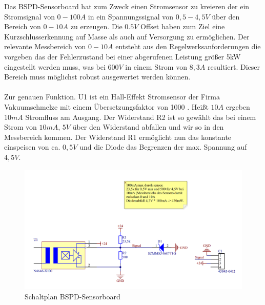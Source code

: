 Das  \ac{BSPD}-Sensorboard hat zum Zweck einen Stromsensor zu kreieren der ein Stromsignal von \ensuremath{0-100 A} in ein Spannungssignal von \ensuremath{0,5-4,5 V} über den Bereich von \ensuremath{0-10 A} zu erzeugen. Die \ensuremath{0.5 V} Offset haben zum Ziel eine Kurzschlusserkennung auf Masse als auch auf Versorgung zu ermöglichen. Der relevante Messbereich von \ensuremath{0-10 A} entsteht aus den Regelwerksanforderungen die vorgeben das der Fehlerzustand bei einer abgerufenen Leistung größer 5kW eingestellt werden muss, was bei \ensuremath{600 V} in einem Strom von \ensuremath{8,3 A} resultiert. Dieser Bereich muss möglichst robust ausgewertet werden können.
\\
\\
Zur genauen Funktion. U1 ist ein Hall-Effekt Stromsensor der Firma Vakuumschmelze mit einem Übersetzungsfaktor von 1000 \cite{T60404-N4646-X100}. Heißt \ensuremath{10 A} ergeben \ensuremath{10 mA} Stromfluss am Ausgang. Der Widerstand R2 ist so gewählt das bei einem Strom von \ensuremath{10 mA}, \ensuremath{5 V} über den Widerstand abfallen und wir so in den Messbereich kommen. Der Widerstand R1 ermöglicht nun das konstante einspeisen von ca. \ensuremath{0,5 V} und die Diode das Begrenzen der max. Spannung auf \ensuremath{4,5 V}.

\begin{figure}
	\centering
	\includegraphics[width=0.7\linewidth]{"bilder/Sensorboard Schaltung"}
	\caption{Schaltplan \ac{BSPD}-Sensorboard}
	\label{fig:sensorboard-schaltung}
\end{figure}

\FloatBarrier
